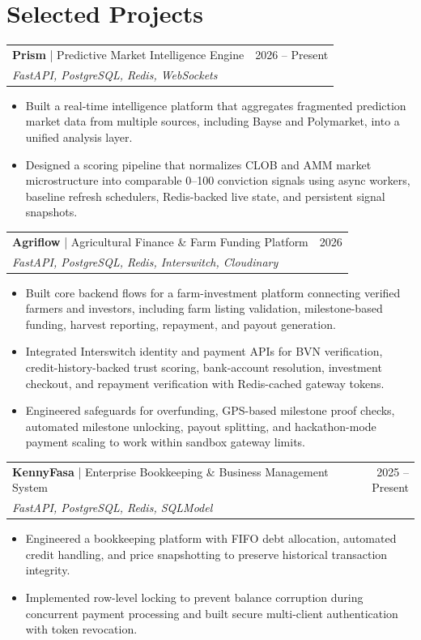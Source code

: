 \documentclass[10pt, letterpaper]{article}
\newcommand{\resumeItem}[1]{\item #1}
\newcommand{\resumeProject}[4]{
    \begin{tabularx}{\textwidth}{Xr}
        \textbf{#1} \hspace{4pt} {\small #2} & #3 \\
        \multicolumn{2}{l}{\textit{#4}} \\
    \end{tabularx}
}
\begin{document}
\section{Selected Projects}
\resumeProject
    {Prism}{| Predictive Market Intelligence Engine}
    {2026 -- Present}
    {FastAPI, PostgreSQL, Redis, WebSockets}
\begin{itemize}[leftmargin=0.15in, itemsep=1pt, topsep=2pt]
    \resumeItem{Built a real-time intelligence platform that aggregates fragmented prediction market data from multiple sources, including Bayse and Polymarket, into a unified analysis layer.}
    \resumeItem{Designed a scoring pipeline that normalizes CLOB and AMM market microstructure into comparable 0--100 conviction signals using async workers, baseline refresh schedulers, Redis-backed live state, and persistent signal snapshots.}
\end{itemize}

\resumeProject
    {Agriflow}{| Agricultural Finance \& Farm Funding Platform}
    {2026}
    {FastAPI, PostgreSQL, Redis, Interswitch, Cloudinary}
\begin{itemize}[leftmargin=0.15in, itemsep=1pt, topsep=2pt]
    \resumeItem{Built core backend flows for a farm-investment platform connecting verified farmers and investors, including farm listing validation, milestone-based funding, harvest reporting, repayment, and payout generation.}
    \resumeItem{Integrated Interswitch identity and payment APIs for BVN verification, credit-history-backed trust scoring, bank-account resolution, investment checkout, and repayment verification with Redis-cached gateway tokens.}
    \resumeItem{Engineered safeguards for overfunding, GPS-based milestone proof checks, automated milestone unlocking, payout splitting, and hackathon-mode payment scaling to work within sandbox gateway limits.}
\end{itemize}

\resumeProject
    {KennyFasa}{| Enterprise Bookkeeping \& Business Management System}
    {2025 -- Present}
    {FastAPI, PostgreSQL, Redis, SQLModel}
\begin{itemize}[leftmargin=0.15in, itemsep=1pt, topsep=2pt]
    \resumeItem{Engineered a bookkeeping platform with FIFO debt allocation, automated credit handling, and price snapshotting to preserve historical transaction integrity.}
    \resumeItem{Implemented row-level locking to prevent balance corruption during concurrent payment processing and built secure multi-client authentication with token revocation.}
\end{itemize}
\end{document}
